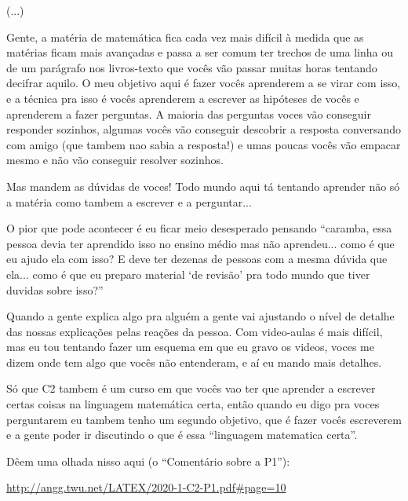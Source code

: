\documentclass[oneside,12pt]{article}
\begin{document}
\ssk

(...)

\ssk

Gente, a matéria de matemática fica cada vez mais difícil à medida que
as matérias ficam mais avançadas e passa a ser comum ter trechos de
uma linha ou de um parágrafo nos livros-texto que vocês vão passar
muitas horas tentando decifrar aquilo. O meu objetivo aqui é fazer
vocês aprenderem a se virar com isso, e a técnica pra isso é vocês
aprenderem a escrever as hipóteses de vocês e aprenderem a fazer
perguntas. A maioria das perguntas voces vão conseguir responder
sozinhos, algumas vocês vão conseguir descobrir a resposta conversando
com amigo (que tambem nao sabia a resposta!) e umas poucas vocês vão
empacar mesmo e não vão conseguir resolver sozinhos.

Mas mandem as dúvidas de voces! Todo mundo aqui tá
tentando aprender não só a matéria como tambem a escrever e a
perguntar...

O pior que pode acontecer é eu ficar meio desesperado pensando
``caramba, essa pessoa devia ter aprendido isso no ensino médio mas
não aprendeu... como é que eu ajudo ela com isso? E deve ter dezenas
de pessoas com a mesma dúvida que ela... como é que eu preparo
material `de revisão' pra todo mundo que tiver duvidas sobre isso?''

Quando a gente explica algo pra alguém a gente vai ajustando
o nível de detalhe das nossas explicações pelas reações da pessoa.
Com video-aulas é mais difícil, mas eu tou tentando fazer um
esquema em que eu gravo os videos, voces me dizem onde tem algo
que vocês não entenderam, e aí eu mando mais detalhes.

Só que C2 tambem é um curso em que vocês vao ter que aprender a
escrever certas coisas na linguagem matemática certa, então quando eu
digo pra voces perguntarem eu tambem tenho um segundo objetivo, que é
fazer vocês escreverem e a gente poder ir discutindo o que é essa
``linguagem matematica certa''.

Dêem uma olhada nisso aqui (o ``Comentário sobre a P1''):

{\footnotesize

\url{http://angg.twu.net/LATEX/2020-1-C2-P1.pdf#page=10}

}

\newpage

%                                                
\end{document}
